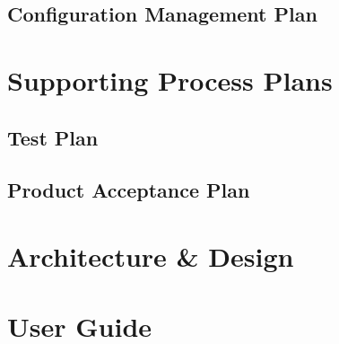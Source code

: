 \documentclass[12pt]{article}
\begin{document}
\subsection{Configuration Management Plan}

\section{Supporting Process Plans}
\subsection{Test Plan}
\subsection{Product Acceptance Plan}

\section{Architecture \& Design}
\section{User Guide}
\end{document}
